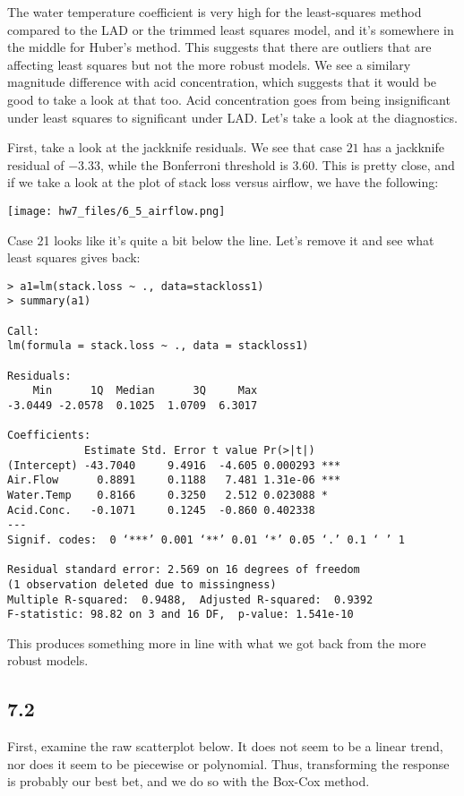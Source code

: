 \documentclass{article}
\begin{document}
The water temperature coefficient is very high for the least-squares method compared to the LAD or the trimmed least squares model, and it's somewhere in the middle for Huber's method. This suggests that there are outliers that are affecting least squares but not the more robust models. We see a similary magnitude difference with acid concentration, which suggests that it would be good to take a look at that too. Acid concentration goes from being insignificant under least squares to significant under LAD. Let's take a look at the diagnostics.

First, take a look at the jackknife residuals. We see that case $21$ has a jackknife residual of $-3.33$, while the Bonferroni threshold is $3.60$. This is pretty close, and if we take a look at the plot of stack loss versus airflow, we have the following:

\texttt{[image: hw7\_files/6\_5\_airflow.png]}

Case 21 looks like it's quite a bit below the line. Let's remove it and see what least squares gives back:
\begin{verbatim}
> a1=lm(stack.loss ~ ., data=stackloss1)
> summary(a1)

Call:
lm(formula = stack.loss ~ ., data = stackloss1)

Residuals:
    Min      1Q  Median      3Q     Max 
-3.0449 -2.0578  0.1025  1.0709  6.3017 

Coefficients:
            Estimate Std. Error t value Pr(>|t|)    
(Intercept) -43.7040     9.4916  -4.605 0.000293 ***
Air.Flow      0.8891     0.1188   7.481 1.31e-06 ***
Water.Temp    0.8166     0.3250   2.512 0.023088 *  
Acid.Conc.   -0.1071     0.1245  -0.860 0.402338    
---
Signif. codes:  0 ‘***’ 0.001 ‘**’ 0.01 ‘*’ 0.05 ‘.’ 0.1 ‘ ’ 1

Residual standard error: 2.569 on 16 degrees of freedom
(1 observation deleted due to missingness)
Multiple R-squared:  0.9488,  Adjusted R-squared:  0.9392 
F-statistic: 98.82 on 3 and 16 DF,  p-value: 1.541e-10
\end{verbatim}
This produces something more in line with what we got back from the more robust models.
\subsection*{7.2}
First, examine the raw scatterplot below. It does not seem to be a linear trend, nor does it seem to be piecewise or polynomial. Thus, transforming the response is probably our best bet, and we do so with the Box-Cox method.
\end{document}
